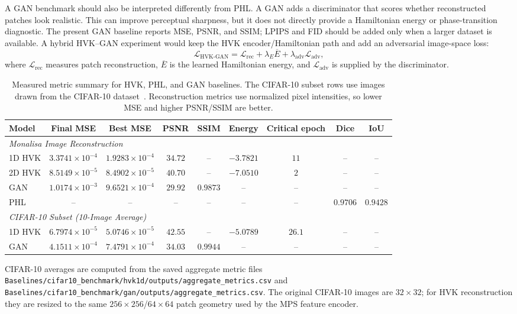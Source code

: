 \documentclass[11pt]{article}
\begin{document}
A GAN benchmark should also be interpreted differently from PHL. A GAN adds a discriminator that scores whether reconstructed patches look realistic. This can improve perceptual sharpness, but it does not directly provide a Hamiltonian energy or phase-transition diagnostic. The present GAN baseline reports MSE, PSNR, and SSIM; LPIPS and FID should be added only when a larger dataset is available. A hybrid HVK--GAN experiment would keep the HVK encoder/Hamiltonian path and add an adversarial image-space loss:
\begin{equation}
\mathcal{L}_{\mathrm{HVK\text{-}GAN}}
=
\mathcal{L}_{\mathrm{rec}}
+ \lambda_E \overline{E}
+ \lambda_{\mathrm{adv}}\mathcal{L}_{\mathrm{adv}},
\end{equation}
where $\mathcal{L}_{\mathrm{rec}}$ measures patch reconstruction, $\overline{E}$ is the learned Hamiltonian energy, and $\mathcal{L}_{\mathrm{adv}}$ is supplied by the discriminator.

\begin{table}[h]
\centering
\caption{Measured metric summary for HVK, PHL, and GAN baselines. The CIFAR-10 subset rows use images drawn from the CIFAR-10 dataset~\cite{krizhevsky2009learning}. Reconstruction metrics use normalized pixel intensities, so lower MSE and higher PSNR/SSIM are better.}
\label{tab:phl_gan_benchmark}
\small
\setlength{\tabcolsep}{3pt}
\begin{tabular}{lcccccccc}
\toprule
Model & Final MSE & Best MSE & PSNR & SSIM & Energy & Critical epoch & Dice & IoU \\
\midrule
\multicolumn{9}{l}{\textit{Monalisa Image Reconstruction}} \\
1D HVK & $3.3741\times10^{-4}$ & $1.9283\times10^{-4}$ & $34.72$ & -- & $-3.7821$ & $11$ & -- & -- \\
2D HVK & $8.5149\times10^{-5}$ & $8.4902\times10^{-5}$ & $40.70$ & -- & $-7.0510$ & $2$ & -- & -- \\
GAN & $1.0174\times10^{-3}$ & $9.6521\times10^{-4}$ & $29.92$ & $0.9873$ & -- & -- & -- & -- \\
PHL & -- & -- & -- & -- & -- & -- & $0.9706$ & $0.9428$ \\
\midrule
\multicolumn{9}{l}{\textit{CIFAR-10 Subset (10-Image Average)}} \\
1D HVK & $6.7974\times10^{-5}$ & $5.0746\times10^{-5}$ & $42.55$ & -- & $-5.0789$ & $26.1$ & -- & -- \\
GAN & $4.1511\times10^{-4}$ & $7.4791\times10^{-4}$ & $34.03$ & $0.9944$ & -- & -- & -- & -- \\
\bottomrule
\end{tabular}
\parbox{0.96\linewidth}{\footnotesize
CIFAR-10 averages are computed from the saved aggregate metric files
\texttt{Baselines/cifar10\_benchmark/hvk1d/outputs/aggregate\_metrics.csv}
and
\texttt{Baselines/cifar10\_benchmark/gan/outputs/aggregate\_metrics.csv}.
The original CIFAR-10 images are $32\times32$; for HVK reconstruction they are resized to the same $256\times256$/$64\times64$ patch geometry used by the MPS feature encoder.}
\end{table}
\end{document}
